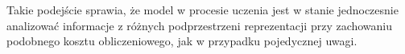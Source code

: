\documentclass[12pt,a4paper,twoside]{book} %
\begin{document}
Takie podejście sprawia, że model w procesie uczenia jest w stanie jednoczesnie analizować informacje z różnych podprzestrzeni reprezentacji przy zachowaniu podobnego kosztu obliczeniowego, jak w przypadku pojedycznej uwagi.





\end{document}
